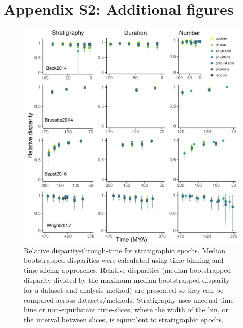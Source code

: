 \documentclass[12pt,a4paper]{article}
\begin{document}
\par{}

\setlength{\parindent}{1cm}

\section{Appendix S2: Additional figures}

\setcounter{figure}{0}  
\setcounter{table}{0}  

  \begin{figure}[!htbp]
    \centering
    \includegraphics[width=1\linewidth, height=1\textheight, keepaspectratio]{figures/fig-dtt-epoch-appendix-revision.pdf}
    \caption[Relative disparity through time for four example datasets.]
    {Relative disparity-through-time for stratigraphic epochs. 
    Median bootstrapped disparities were calculated using time binning and time-slicing approaches. 
    Relative disparities (median bootstrapped disparity divided by the maximum median bootstrapped disparity for a dataset and analysis method) are presented so they can be compared across datasets/methods. 
    Stratigraphy uses unequal time bins or non-equidistant time-slices, where the width of the bin, or the interval between slices, is equivalent to stratigraphic epochs. 
}
\end{figure}
\end{document}
